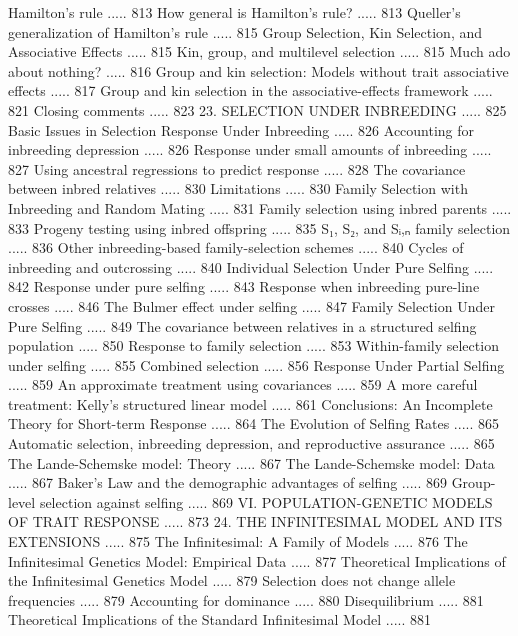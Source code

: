 \documentclass{article}
\begin{document}
Hamilton's rule ..... 813
How general is Hamilton's rule? ..... 813
Queller's generalization of Hamilton's rule ..... 815
Group Selection, Kin Selection, and Associative Effects ..... 815
Kin, group, and multilevel selection ..... 815
Much ado about nothing? ..... 816
Group and kin selection: Models without trait associative effects ..... 817
Group and kin selection in the associative-effects framework ..... 821
Closing comments ..... 823
23. SELECTION UNDER INBREEDING ..... 825
Basic Issues in Selection Response Under Inbreeding ..... 826
Accounting for inbreeding depression ..... 826
Response under small amounts of inbreeding ..... 827
Using ancestral regressions to predict response ..... 828
The covariance between inbred relatives ..... 830
Limitations ..... 830
Family Selection with Inbreeding and Random Mating ..... 831
Family selection using inbred parents ..... 833
Progeny testing using inbred offspring ..... 835
S₁, S₂, and Sᵢ,ₙ family selection ..... 836
Other inbreeding-based family-selection schemes ..... 840
Cycles of inbreeding and outcrossing ..... 840
Individual Selection Under Pure Selfing ..... 842
Response under pure selfing ..... 843
Response when inbreeding pure-line crosses ..... 846
The Bulmer effect under selfing ..... 847
Family Selection Under Pure Selfing ..... 849
The covariance between relatives in a structured selfing population ..... 850
Response to family selection ..... 853
Within-family selection under selfing ..... 855
Combined selection ..... 856
Response Under Partial Selfing ..... 859
An approximate treatment using covariances ..... 859
A more careful treatment: Kelly's structured linear model ..... 861
Conclusions: An Incomplete Theory for Short-term Response ..... 864
The Evolution of Selfing Rates ..... 865
Automatic selection, inbreeding depression, and reproductive assurance ..... 865
The Lande-Schemske model: Theory ..... 867
The Lande-Schemske model: Data ..... 867
Baker's Law and the demographic advantages of selfing ..... 869
Group-level selection against selfing ..... 869
VI. POPULATION-GENETIC MODELS OF TRAIT RESPONSE ..... 873
24. THE INFINITESIMAL MODEL AND ITS EXTENSIONS ..... 875
The Infinitesimal: A Family of Models ..... 876
The Infinitesimal Genetics Model: Empirical Data ..... 877
Theoretical Implications of the Infinitesimal Genetics Model ..... 879
Selection does not change allele frequencies ..... 879
Accounting for dominance ..... 880
Disequilibrium ..... 881
Theoretical Implications of the Standard Infinitesimal Model ..... 881
\end{document}
